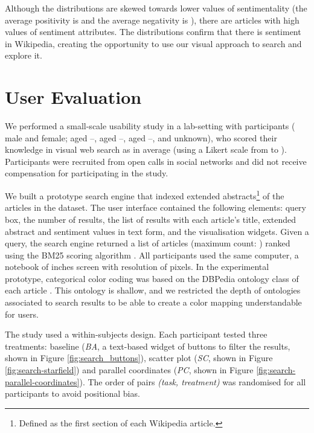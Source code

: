 \documentclass{sig-alternate}
\newcommand{\spara}[1]{\smallskip\noindent{\bf #1}}
\begin{document}
Although the distributions are skewed towards lower values of sentimentality (the average positivity is  and the average negativity is ), there are articles with high values of sentiment attributes. 
The distributions confirm that there is sentiment in Wikipedia, creating the opportunity to use our visual approach to search and explore it.  




\section{User Evaluation}

We performed a small-scale usability study in a lab-setting with  participants ( male and  female;  aged --,  aged --,  aged --, and  unknown), who scored their knowledge in visual web search as  in average (using a Likert scale from  to ). 
Participants were recruited from open calls in social networks and did not receive compensation for participating in the study. 

\spara{Apparatus.}
We built a prototype search engine that indexed extended abstracts\footnote{Defined as the first section of each Wikipedia article.} of the  articles in the dataset. 
The user interface contained the following elements: query box, the number of results, the list of results with each article's title, extended abstract and sentiment values in text form, and the visualisation widgets. 
Given a query, the search engine returned a list of articles (maximum count: ) ranked using the BM25 scoring algorithm \cite{baeza2011modern}.
All participants used the same computer, a notebook of  inches screen with resolution of  pixels. 
In the experimental prototype, categorical color coding was based on the DBPedia ontology class of each article \cite{auer2007dbpedia}. This ontology is shallow, and we restricted the depth of ontologies associated to search results to be able to create a color mapping understandable for users.

\spara{Design and Procedure.} 
The study used a within-subjects design. 
Each participant tested three treatments: baseline (\emph{BA}, a text-based widget of buttons to filter the results, shown in Figure \ref{fig:search_buttons}), scatter plot (\emph{SC}, shown in Figure \ref{fig:search-starfield}) and parallel coordinates (\emph{PC}, shown in Figure \ref{fig:search-parallel-coordinates}). 
The order of pairs \textit{(task, treatment)} was randomised for all participants to avoid positional bias. 
\end{document}
